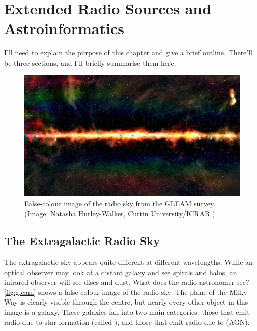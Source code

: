 \chapter{Extended Radio Sources and Astroinformatics}
\label{cha:background}

I'll need to explain the purpose of this chapter and give a brief outline. There'll be three sections, and I'll briefly summarise them here.

    \begin{figure}[ht]
        \includegraphics[width=\textwidth]{images/gleam.jpg}
        \caption[False-colour image of the radio sky from the GLEAM survey.]{\label{fig:gleam} False-colour image of the radio sky from the GLEAM survey. (Image: Natasha Hurley-Walker, Curtin University/ICRAR \citeneeded)}
    \end{figure}

\section{The Extragalactic Radio Sky}
\label{sec:extragalactic-radio-sky}

    The extragalactic sky appears quite different at different wavelengths. While an optical observer may look at a distant galaxy and see spirals and halos, an infrared observer will see discs and dust. What does the radio astronomer see? 
    \autoref{fig:gleam} shows a false-colour image of the radio sky. The plane of the Milky Way is clearly visible through the centre, but nearly every other object in this image is a galaxy. These galaxies fall into two main categories: those that emit radio due to star formation (called ), and those that emit radio due to  (AGN).

